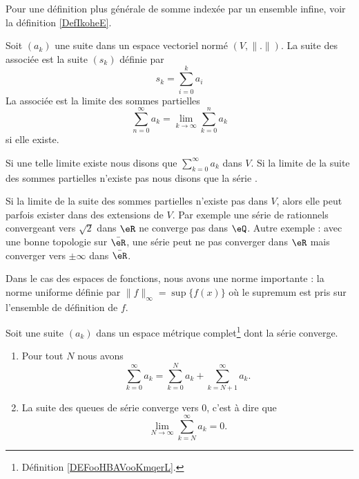 Pour une définition plus générale de somme indexée par un ensemble infine, voir la définition \ref{DefIkoheE}.
\begin{definition}\label{DefGFHAaOL}
    Soit \( (a_k)\) une suite dans un espace vectoriel normé \( (V,\| . \| )\). La suite des  associée est la suite \( (s_k)\) définie par
    \begin{equation}
        s_k=\sum_{i=0}^ka_i
    \end{equation}
    La  associée est la limite des sommes partielles
    \begin{equation}
        \sum_{n=0}^{\infty}a_k=\lim_{k\to \infty} \sum_{k=0}^na_k
    \end{equation}
    si elle existe.

    Si une telle limite existe nous disons que \( \sum_{k=0}^{\infty}a_k\)  dans \( V\). Si la limite de la suite des sommes partielles n'existe pas nous disons que la série .
\end{definition}

\begin{remark}
    Si la limite de la suite des sommes partielles n'existe pas dans \( V\), alors elle peut parfois exister dans des extensions de \( V\). Par exemple une série de rationnels convergeant vers \( \sqrt{2}\) dans \( \eR\) ne converge pas dans \( \eQ\). Autre exemple : avec une bonne topologie sur \( \bar \eR\), une série peut ne pas converger dans \( \eR\) mais converger vers \( \pm\infty\) dans \( \bar \eR\).
\end{remark}

Dans le cas des espaces de fonctions, nous avons une norme importante : la norme uniforme définie par \( \| f \|_{\infty}=\sup\{ f(x) \}\) où le supremum est pris sur l'ensemble de définition de \( f\).

\begin{lemma}       \label{LEMooHUZEooSyPipb}
    Soit une suite \( (a_k)\) dans un espace métrique complet\footnote{Définition \ref{DEFooHBAVooKmqerL}.} dont la série converge.
    
    \begin{enumerate}
        \item   \label{ITEMooPFSQooDhKFGL}
            Pour tout \( N\) nous avons
            \begin{equation}
                \sum_{k=0}^{\infty}a_k=\sum_{k=0}^Na_k+\sum_{k=N+1}^{\infty}a_k.
            \end{equation}
        \item       \label{ITEMooQNHMooUPjupB}
            La suite des queues de série converge vers \( 0\), c'est à dire que
            \begin{equation}
                \lim_{N\to \infty} \sum_{k=N}^{\infty}a_k=0.
            \end{equation}
    \end{enumerate}
\end{lemma}

